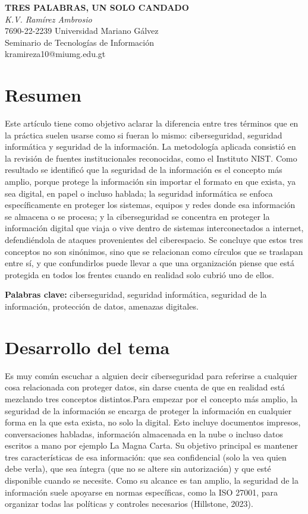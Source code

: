 \documentclass[12pt,letterpaper]{article}
\begin{document}
\begin{center}
{\bfseries TRES PALABRAS, UN SOLO CANDADO}\\[4pt]
\textit{K.V. Ramírez Ambrosio}\\
7690-22-2239 \quad Universidad Mariano Gálvez\\
Seminario de Tecnologías de Información\\
kramireza10@miumg.edu.gt
\end{center}

\vspace{6pt}

\section*{Resumen}
Este artículo tiene como objetivo aclarar la diferencia entre tres términos que en la práctica suelen usarse como si fueran lo mismo: ciberseguridad, seguridad informática y seguridad de la información. La metodología aplicada consistió en la revisión de fuentes institucionales reconocidas, como el Instituto NIST. Como resultado se identificó que la seguridad de la información es el concepto más amplio, porque protege la información sin importar el formato en que exista, ya sea digital, en papel o incluso hablada; la seguridad informática se enfoca específicamente en proteger los sistemas, equipos y redes donde esa información se almacena o se procesa; y la ciberseguridad se concentra en proteger la información digital que viaja o vive dentro de sistemas interconectados a internet, defendiéndola de ataques provenientes del ciberespacio. Se concluye que estos tres conceptos no son sinónimos, sino que se relacionan como círculos que se traslapan entre sí, y que confundirlos puede llevar a que una organización piense que está protegida en todos los frentes cuando en realidad solo cubrió uno de ellos.

\textbf{Palabras clave:} ciberseguridad, seguridad informática, seguridad de la información, protección de datos, amenazas digitales.

\section*{Desarrollo del tema}

Es muy común escuchar a alguien decir ciberseguridad para referirse a cualquier cosa relacionada con proteger datos, sin darse cuenta de que en realidad está mezclando tres conceptos distintos.Para empezar por el concepto más amplio, la seguridad de la información se encarga de proteger la información en cualquier forma en la que esta exista, no solo la digital. Esto incluye documentos impresos, conversaciones habladas, información almacenada en la nube o incluso datos escritos a mano por ejemplo La Magna Carta. Su objetivo principal es mantener tres características de esa información: que sea confidencial (solo la vea quien debe verla), que sea íntegra (que no se altere sin autorización) y que esté disponible cuando se necesite. Como su alcance es tan amplio, la seguridad de la información suele apoyarse en normas específicas, como la ISO 27001, para organizar todas las políticas y controles necesarios (Hillstone, 2023).
\end{document}
